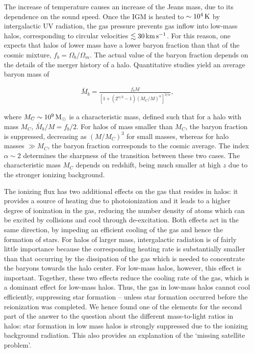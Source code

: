 \documentclass[a4paper,11pt]{article}
\begin{document}
{\noindent}The increase of temperature causes an increase of the Jeans mass, due to its dependence on the sound speed. Once the IGM is heated to $\sim10^4\,{\rm K}$ by intergalactic UV radiation, the gas pressure prevents gas inflow into low-mass halos, corresponding to circular velocities $\lesssim30\,{\rm km\,s^{-1}}$. For this reason, one expects that halos of lower mass have a lower baryon fraction than that of the cosmic mixture, $f_b=\Omega_b/\Omega_m$. The actual value of the baryon fraction depends on the details of the merger history of a halo. Quantitative studies yield an average baryon mass of

\begin{align*}
    \bar{M}_b = \frac{f_b M}{[1+(2^{\alpha/3}-1)(M_C/M)^\alpha]^{3/\alpha}},
\end{align*}

{\noindent}where $M_C\sim10^9\,{\rm M_\odot}$ is a characteristic mass, defined such that for a halo with mass $M_C$, $\bar{M}_b/M=f_b/2$. For halos of mass smaller than $M_C$, the baryon fraction is suppressed, decreasing as $(M/M_C)^3$ for small masses, whereas for halo masses $\gg M_C$, the baryon fraction corresponds to the cosmic average. The index $\alpha\sim2$ determines the sharpness of the transition between these two cases. The characteristic mass $M_C$ depends on redshift, being much smaller at high $z$ due to the stronger ionizing background.

{\noindent}The ionizing flux has two additional effects on the gas that resides in halos: it provides a source of heating due to photoionization and it leads to a higher degree of ionization in the gas, reducing the number density of atoms which can be excited by collisions and cool through de-excitation. Both effects act in the same direction, by impeding an efficient cooling of the gas and hence the formation of stars. For halos of larger mass, intergalactic radiation is of fairly little importance because the corresponding heating rate is substantially smaller than that occurring by the dissipation of the gas which is needed to concentrate the baryons towards the halo center. For low-mass halos, however, this effect is important. Together, these two effects reduce the cooling rate of the gas, which is a dominant effect for low-mass halos. Thus, the gas in low-mass halos cannot cool efficiently, suppressing star formation -- unless star formation occurred before the reionization was completed. We hence found one of the elements for the second part of the answer to the question about the different mass-to-light ratios in halos: star formation in low mass halos is strongly suppressed due to the ionizing background radiation. This also provides an explanation of the `missing satellite problem'.
\end{document}

